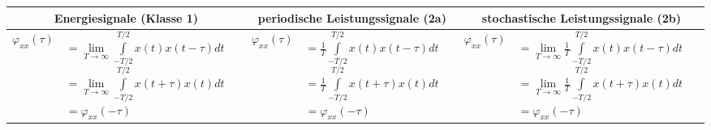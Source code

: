 		\bgroup
		\setlength{\tabcolsep}{1mm}
		\begin{tabularx}{\textwidth}{|cX|cX|cX|}
		\hline 
			\multicolumn{2}{|c|}{\textbf{Energiesignale} (Klasse 1)} &
			\multicolumn{2}{|c|}{\textbf{periodische Leistungssignale} (2a)} & 
			\multicolumn{2}{|c|}{\textbf{stochastische Leistungssignale} (2b)}
		\\ \hline 
			$ \varphi_{xx}(\tau) $ &
			$ 		= \lim\limits_{T\to\infty}\int\limits_{-T/2}^{T/2} x(t)x(t-\tau)dt $ \linebreak
				$ 	= \lim\limits_{T\to\infty}\int\limits_{-T/2}^{T/2} x(t+\tau)x(t)dt $ \linebreak
				$	= \varphi_{xx}(-\tau)$ &
			$ \varphi_{xx}(\tau) $ &
			$ 		= \frac {1} {T} \int\limits_{-T/2}^{T/2} x(t)x(t-\tau)dt $ \linebreak
				$	= \frac {1} {T} \int\limits_{-T/2}^{T/2} x(t+\tau)x(t)dt $ \linebreak
				$	= \varphi_{xx}(-\tau) $ &
			$ \varphi_{xx}(\tau) $ &
			$		= \lim\limits_{T\rightarrow\infty} \frac {1} {T} \int\limits_{-T/2}^{T/2} x(t)x(t-\tau)dt $ \linebreak
				$	= \lim\limits_{T\rightarrow\infty}\frac {1} {T} \int\limits_{-T/2}^{T/2} x(t+\tau)x(t)dt $ \linebreak
				$ = \varphi_{xx}(-\tau) $
		\\ \hline
		\end{tabularx} 
		\egroup
		
